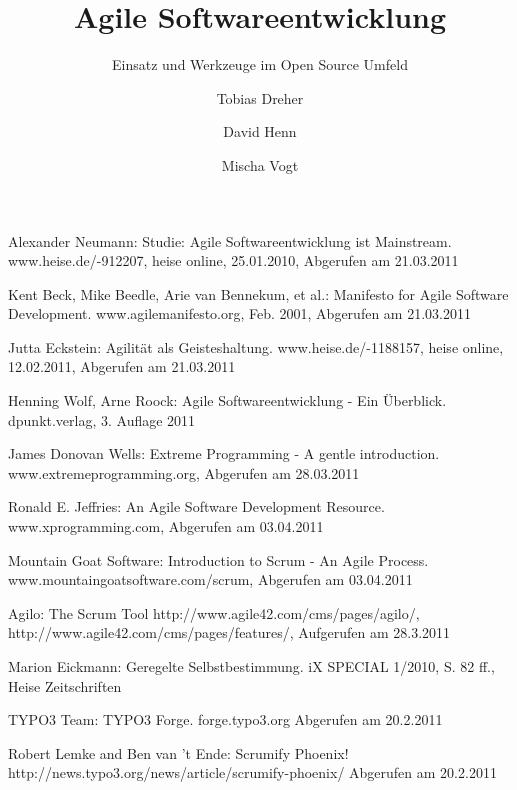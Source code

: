 \documentclass[german,english]{header}
\begin{document}

\title{Agile Softwareentwicklung}
\subtitle{Einsatz und Werkzeuge im Open Source Umfeld}
\author{Tobias Dreher\and David Henn\and Mischa Vogt}

\maketitle







\begin{thebibliography}{5}
Alexander Neumann:
Studie: Agile Softwareentwicklung ist Mainstream.
www.heise.de/-912207, heise online, 25.01.2010, Abgerufen am 21.03.2011

Kent Beck, Mike Beedle, Arie van Bennekum, et al.: 
Manifesto for Agile Software Development.
www.agilemanifesto.org, Feb. 2001, Abgerufen am 21.03.2011

Jutta Eckstein: 
Agilität als Geisteshaltung.
www.heise.de/-1188157, heise online, 12.02.2011, Abgerufen am 21.03.2011

Henning Wolf, Arne Roock: 
Agile Softwareentwicklung - Ein Überblick.
dpunkt.verlag, 3. Auflage 2011

James Donovan Wells: 
Extreme Programming - A gentle introduction.
www.extremeprogramming.org, Abgerufen am 28.03.2011

Ronald E. Jeffries: 
An Agile Software Development Resource.
www.xprogramming.com, Abgerufen am 03.04.2011

Mountain Goat Software: 
Introduction to Scrum - An Agile Process.
www.mountaingoatsoftware.com/scrum, Abgerufen am 03.04.2011

Agilo: The Scrum Tool
http://www.agile42.com/cms/pages/agilo/,
http://www.agile42.com/cms/pages/features/,
Aufgerufen am 28.3.2011

Marion Eickmann: 
Geregelte Selbstbestimmung.
iX SPECIAL 1/2010, S. 82 ff., Heise Zeitschriften

TYPO3 Team:
TYPO3 Forge.
forge.typo3.org Abgerufen am 20.2.2011

Robert Lemke and Ben van 't Ende:
Scrumify Phoenix!
http://news.typo3.org/news/article/scrumify-phoenix/ Abgerufen am 20.2.2011


\end{thebibliography}
\end{document}
